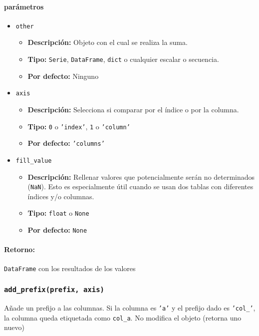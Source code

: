         \paragraph{\textbf{parámetros}}
        \begin{itemize}
            \item \texttt{other}
                \begin{itemize}
                    \item \textbf{Descripción:} Objeto con el cual se realiza la suma.
                    \item \textbf{Tipo:} \texttt{Serie}, \texttt{DataFrame}, \texttt{dict} o cualquier escalar o secuencia.
                    \item \textbf{Por defecto:} Ninguno
                \end{itemize}
            \item \texttt{axis}
                \begin{itemize}
                    \item \textbf{Descripción:} Selecciona si comparar por el índice o por la columna.
                    \item \textbf{Tipo:} \texttt{0} o \texttt{'index'}, \texttt{1} o \texttt{'column'}
                    \item \textbf{Por defecto:} \texttt{'columns'}
                \end{itemize}
            \item \texttt{fill\_value}
                \begin{itemize}
                    \item \textbf{Descripción:} Rellenar valores que potencialmente serán no determinados (\texttt{NaN}). Esto es especialmente útil cuando se usan dos tablas con diferentes índices y/o columnas.
                    \item \textbf{Tipo:} \texttt{float} o \texttt{None}
                    \item \textbf{Por defecto:} \texttt{None}
                \end{itemize}
        \end{itemize}
        \paragraph{Retorno:} \texttt{DataFrame} con los resultados de los valores





        \subsubsection{\texttt{add\_prefix(prefix, axis)}} Añade un prefijo a las columnas. Si la columna es \texttt{'a'} y el prefijo dado es \texttt{'col\_'}, la columna queda etiquetada como \texttt{col\_a}. No modifica el objeto (retorna uno nuevo)
